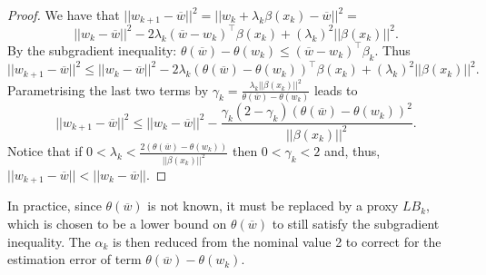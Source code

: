 \begin{proof}
We have that $|| w_{k+1} - \overline{w} ||^2 = || w_k + \lambda_k\beta(x_k) - \overline{w} ||^2 = $ 
%
$$|| w_{k} - \overline{w}||^2 - 2\lambda_k(\overline{w} - w_k)^\top \beta(x_k) + (\lambda_k)^2||\beta(x_k)||^2.$$
%
By the subgradient inequality: $\theta(\overline{w}) - \theta(w_k) \leq (\overline{w} - w_k)^\top \beta_k$. Thus
%
$$|| w_{k+1} - \overline{w} ||^2 \leq || w_{k} - \overline{w}||^2 - 2\lambda_k(\theta(\overline{w}) - \theta(w_k))^\top \beta(x_k) + (\lambda_k)^2||\beta(x_k)||^2.$$
%
Parametrising the last two terms by $\gamma_k = \frac{\lambda_k ||\beta(x_k)||^2}{\theta(\overline{w}) - \theta(w_k)}$ leads to
%
$$|| w_{k+1} - \overline{w} ||^2 \leq || w_{k} - \overline{w} ||^2 - \frac{\gamma_k(2-\gamma_k)(\theta(\overline{w}) - \theta(w_k))^2}{||\beta(x_k)||^2}.$$
%
Notice that if $0 < \lambda_k < \frac{2(\theta(\overline{w}) - \theta(w_k))}{||\beta(x_k)||^2}$ then $0 < \gamma_k < 2$ and, thus, $|| w_{k+1} - \overline{w}|| < || w_{k} - \overline{w}||$.
\end{proof}

In practice, since $\theta(\overline{w})$ is not known, it must be replaced by a proxy $LB_k$, which is chosen to be a lower bound on $\theta(\overline{w})$ to still satisfy the subgradient inequality. The $\alpha_k$ is then reduced from the nominal value 2 to correct for the estimation error of term $\theta(\overline{w}) - \theta(w_k)$.
